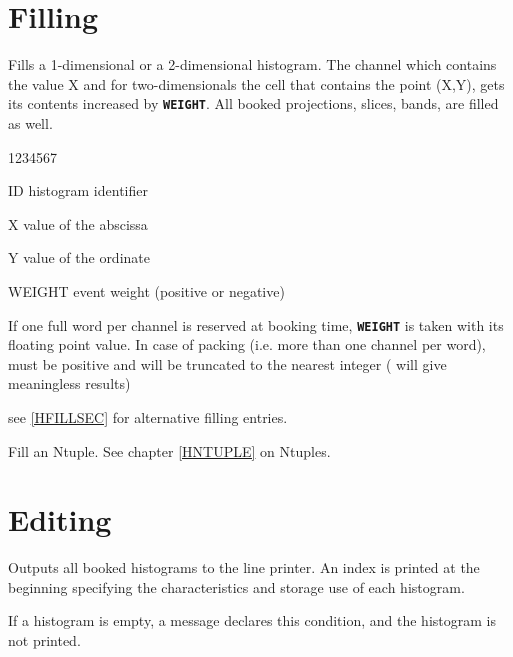 \section{\label{HFILLSEC}Filling}
\Action Fills a 1-dimensional or a 2-dimensional histogram.
The
channel which contains the value X and for two-dimensionals the cell that
contains the point (X,Y), gets its contents increased by
{\tt\bf WEIGHT}.
All booked projections, slices, bands, are filled as well.
\Pdesc\begin{DLtt}{1234567}
\item[ID] histogram identifier
\item[X] value of the abscissa
\item[Y] value of the ordinate
\item[WEIGHT] event weight (positive or negative)
\end{DLtt}
\Remark
\begin{UL}
\item If one full word per channel is reserved at booking time,
{\tt\bf WEIGHT} is taken
with its floating point value.
In case of packing (i.e. more than one channel
per word),  must be
positive and will be truncated to the nearest integer
( will give meaningless results)
\item see \ref{HFILLSEC} for alternative filling entries.
\end{UL}
 
 
\Action
Fill an Ntuple. See chapter \ref{HNTUPLE} on Ntuples.
 
\section{\label{HEDITSEC}Editing}
 
 
\Action
Outputs all booked histograms to the line printer.
An index is printed at
the beginning specifying the characteristics and storage use of each
histogram.
 
\Remark
\begin{UL}
\item
If a histogram is empty, a message declares this condition, and the
histogram is not printed.
\end{UL}
 



